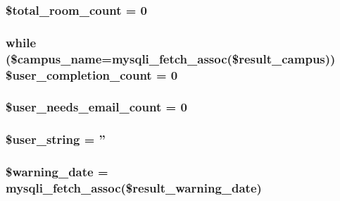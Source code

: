 \hypertarget{index_8php_afa16349167e96ad1b72ad891ac3d0b07}{
\subsubsection[{\$total\-\_\-room\-\_\-count}]{\setlength{\rightskip}{0pt plus 5cm}\$total\-\_\-room\-\_\-count = 0}}\label{index_8php_afa16349167e96ad1b72ad891ac3d0b07}
\hypertarget{index_8php_a80ebec900a7702cc0c8558ce53366963}{
\subsubsection[{\$user\-\_\-completion\-\_\-count}]{\setlength{\rightskip}{0pt plus 5cm}while (\$campus\-\_\-name=mysqli\-\_\-fetch\-\_\-assoc(\$result\-\_\-campus)) \$user\-\_\-completion\-\_\-count = 0}}\label{index_8php_a80ebec900a7702cc0c8558ce53366963}
\hypertarget{index_8php_a33eb6cef4540fcb421e0cd11335798a3}{
\subsubsection[{\$user\-\_\-needs\-\_\-email\-\_\-count}]{\setlength{\rightskip}{0pt plus 5cm}\$user\-\_\-needs\-\_\-email\-\_\-count = 0}}\label{index_8php_a33eb6cef4540fcb421e0cd11335798a3}
\hypertarget{index_8php_af990a6460b9371f7ac0a860c265c47d9}{
\subsubsection[{\$user\-\_\-string}]{\setlength{\rightskip}{0pt plus 5cm}\$user\-\_\-string = ''}}\label{index_8php_af990a6460b9371f7ac0a860c265c47d9}
\hypertarget{index_8php_a6e9f4ec234df3b3983352f341b57f8ba}{
\subsubsection[{\$warning\-\_\-date}]{\setlength{\rightskip}{0pt plus 5cm}\$warning\-\_\-date = mysqli\-\_\-fetch\-\_\-assoc(\$result\-\_\-warning\-\_\-date)}}\label{index_8php_a6e9f4ec234df3b3983352f341b57f8ba}
